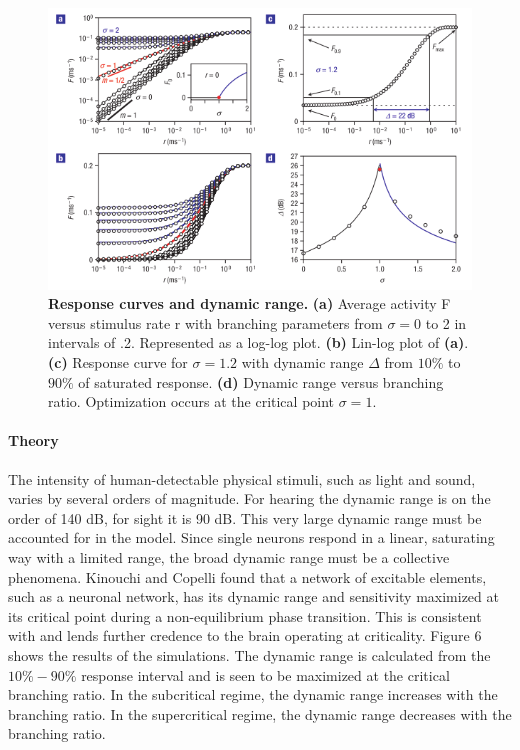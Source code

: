 \documentclass[12pt]{article}
\begin{document}
\begin{figure}      
  \begin{center}    
 \includegraphics[width=.8\textwidth]{dynamicrangetheorycopelli}    
    \caption{\textbf{Response curves and dynamic range.} \textbf{(a)} Average activity F versus stimulus rate r with branching parameters from $\sigma = 0$ to 2 in intervals of .2. Represented as a log-log plot. \textbf{(b)} Lin-log plot of \textbf{(a)}. \textbf{(c)} Response curve for $\sigma = 1.2$ with dynamic range $\Delta$ from $10\%$ to $90\%$ of saturated response. \textbf{(d)} Dynamic range versus branching ratio. Optimization occurs at the critical point $\sigma = 1$.\cite{Kinouchi2006b}}   
   \label{Figure::Dynamic Range Theory}   
  \end{center}     
   \end{figure}
   
\paragraph{Theory}
The intensity of human-detectable physical stimuli, such as light and sound, varies by several orders of magnitude. For hearing the dynamic range is on the order of 140 dB, for sight it is 90 dB. This very large dynamic range must be accounted for in the model. Since single neurons respond in a linear, saturating way with a limited range, the broad dynamic range must be a collective phenomena. Kinouchi and Copelli found that a network of excitable elements, such as a neuronal network, has its dynamic range and sensitivity maximized at its critical point during a non-equilibrium phase transition\cite{Kinouchi2006b}. This is consistent with and lends further credence to the brain operating at criticality. Figure 6 shows the results of the simulations. The dynamic range is calculated from the $10\%-90\%$ response interval and is seen to be maximized at the critical branching ratio. In the subcritical regime, the dynamic range increases with the branching ratio. In the supercritical regime, the dynamic range decreases with the branching ratio. \cite{Larremore2011a, Larremore2012a}
\end{document}

